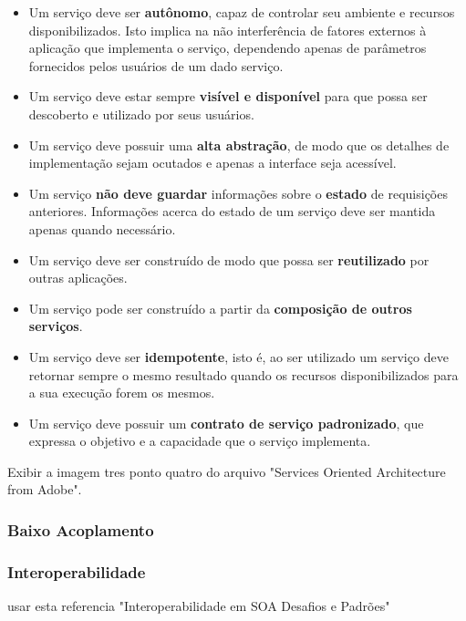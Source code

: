 \begin{itemize}
\item Um serviço deve ser \textbf{autônomo},  capaz de controlar seu ambiente e recursos disponibilizados. Isto implica na não interferência de fatores externos à aplicação que implementa o serviço, dependendo apenas de parâmetros fornecidos pelos usuários de um dado serviço.

\item Um serviço deve estar sempre \textbf{visível e disponível} para que possa ser descoberto e utilizado por seus usuários.

\item Um serviço deve possuir uma \textbf{alta abstração}, de modo que os detalhes de implementação sejam ocutados e apenas a interface seja acessível.

\item Um serviço \textbf{não deve guardar} informações sobre o \textbf{estado} de requisições anteriores. Informações acerca do estado de um serviço deve ser mantida apenas quando necessário.

\item Um serviço deve ser construído de modo que possa ser \textbf{reutilizado} por outras aplicações.

\item Um serviço pode ser construído a partir da \textbf{composição de outros serviços}.

\item Um serviço deve ser \textbf{idempotente}, isto é, ao ser utilizado um serviço deve retornar sempre o mesmo resultado quando os recursos disponibilizados para a sua execução forem os mesmos.

\item Um serviço deve possuir um \textbf{contrato de serviço padronizado}, que expressa o objetivo e a capacidade que o serviço implementa.
\end{itemize}

Exibir a imagem tres ponto quatro do arquivo "Services Oriented Architecture from Adobe".


\subsubsection{Baixo Acoplamento}

\subsubsection{Interoperabilidade}
usar esta referencia "Interoperabilidade em SOA Desafios e Padrões"


